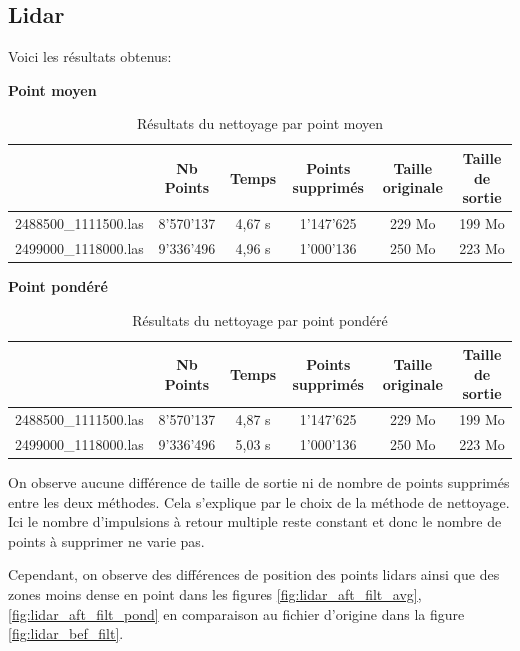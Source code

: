 \subsection{Lidar}
Voici les résultats obtenus:

\textbf{Point moyen}

\begin{table}[htb!]
\begin{tabular}{l|c|c|c|c|c|}
\cline{2-6}
\multicolumn{1}{c|}{}                      & Nb Points & Temps  & Points supprimés & Taille originale & Taille de sortie \\ \hline
\multicolumn{1}{|l|}{2488500\_1111500.las} & 8'570'137 & 4,67 s & 1'147'625        & 229 Mo          & 199 Mo           \\ \hline
\multicolumn{1}{|l|}{2499000\_1118000.las} & 9'336'496 & 4,96 s & 1'000'136        & 250 Mo          & 223 Mo           \\ \hline
\end{tabular}
\caption{Résultats du nettoyage par point moyen}
\label{tab:las_cleaning_avg}
\end{table}

\textbf{Point pondéré}

\begin{table}[htb!]
\begin{tabular}{l|c|c|c|c|c|}
\cline{2-6}
\multicolumn{1}{c|}{}                      & Nb Points & Temps  & Points supprimés & Taille originale & Taille de sortie \\ \hline
\multicolumn{1}{|l|}{2488500\_1111500.las} & 8'570'137 & 4,87 s & 1'147'625        & 229 Mo          & 199 Mo           \\ \hline
\multicolumn{1}{|l|}{2499000\_1118000.las} & 9'336'496 & 5,03 s & 1'000'136        & 250 Mo          & 223 Mo           \\ \hline
\end{tabular}
\caption{Résultats du nettoyage par point pondéré}
\label{tab:las_cleaning_ponderated}
\end{table}

On observe aucune différence de taille de sortie ni de nombre de points supprimés entre les deux méthodes.
Cela s'explique par le choix de la méthode de nettoyage.
Ici le nombre d'impulsions à retour multiple reste constant et donc le nombre de points à supprimer ne varie pas.

Cependant, on observe des différences de position des points lidars ainsi que des zones moins dense en point
dans les figures \ref{fig:lidar_aft_filt_avg}, \ref{fig:lidar_aft_filt_pond} en
comparaison au fichier d'origine dans la figure \ref{fig:lidar_bef_filt}.

